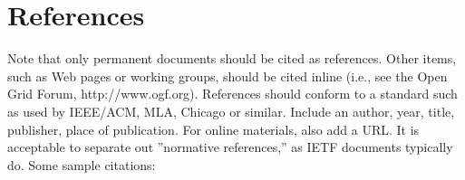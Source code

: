 \documentclass[10pt,a4paper,british]{article}
\begin{document}
\section{References}

Note that only permanent documents should be cited as
references. Other items, such as Web pages or working groups, should
be cited inline (i.e., see the Open Grid Forum,
http://www.ogf.org). References should conform to a standard such as
used by IEEE/ACM, MLA, Chicago or similar. Include an author, year,
title, publisher, place of publication. For online materials, also add
a URL. It is acceptable to separate out ''normative references,'' as
IETF documents typically do. Some sample citations:
\end{document}

